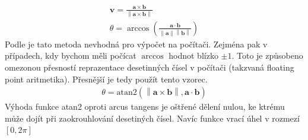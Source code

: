 \documentclass[twoside]{ctuthesis}
\newcommand{\norm}[1]{\left\lVert#1\right\rVert}
\begin{document}
\begin{align}
    \mathbf{v} = \frac{\mathbf{a} \times \mathbf{b}}{\norm{\mathbf{a}\times \mathbf{b}}}\\
    \theta = \arccos \left( \frac{\mathbf{a} \cdot \mathbf{b}}{\norm{\mathbf{a}}\norm{\mathbf{b}}} \right)
\end{align}
Podle \cite{james_w_angle_2014} je tato metoda nevhodná pro výpočet na počítači. Zejména pak v případech, kdy bychom měli počícat $\arccos$ hodnot blízko $\pm 1$. Toto je způsobeno omezonou přesností reprazentace desetinných čísel v počítači (takzvaná floating point aritmetika). Přesnější je tedy použít tento vzorec.
\begin{align}
    \theta = \text{atan2}\left( \norm{\mathbf{a} \times \mathbf{b}}, \mathbf{a}\cdot \mathbf{b} \right) 
\end{align}
Výhoda funkce atan2 oproti arcus tangens je oštřené dělení nulou, ke ktrému může dojít při zaokrouhlování desetiných čísel. Navíc funkce vrací úhel v rozmezí $\left[ 0, 2\pi \right]$
\end{document}
